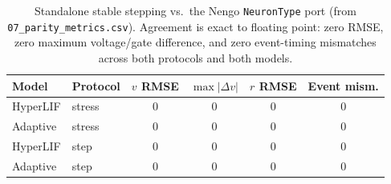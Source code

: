 \begin{table}[t]
\centering
\caption{Standalone stable stepping vs.\ the Nengo \texttt{NeuronType} port (from \texttt{07\_parity\_metrics.csv}). Agreement is exact to floating point: zero RMSE, zero maximum voltage/gate difference, and zero event-timing mismatches across both protocols and both models.}
\label{tab:parity}
\begin{tabular}{llcccc}
\toprule
Model & Protocol & $v$ RMSE & $\max|\Delta v|$ & $r$ RMSE & Event mism. \\
\midrule
HyperLIF & stress & $0$ & $0$ & $0$ & 0 \\
Adaptive & stress & $0$ & $0$ & $0$ & 0 \\
HyperLIF & step & $0$ & $0$ & $0$ & 0 \\
Adaptive & step & $0$ & $0$ & $0$ & 0 \\
\bottomrule
\end{tabular}
\end{table}
